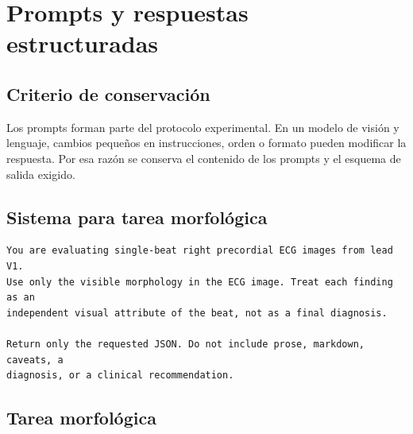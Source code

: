 \chapter{Prompts y respuestas estructuradas}
\label{app:prompts}

\section{Criterio de conservaci\'on}

Los prompts forman parte del protocolo experimental. En un modelo de visi\'on y lenguaje, cambios peque\~nos en instrucciones, orden o formato pueden modificar la respuesta. Por esa raz\'on se conserva el contenido de los prompts y el esquema de salida exigido.

\section{Sistema para tarea morfol\'ogica}

\begin{lstlisting}
You are evaluating single-beat right precordial ECG images from lead V1.
Use only the visible morphology in the ECG image. Treat each finding as an
independent visual attribute of the beat, not as a final diagnosis.

Return only the requested JSON. Do not include prose, markdown, caveats, a
diagnosis, or a clinical recommendation.
\end{lstlisting}

\section{Tarea morfol\'ogica}

